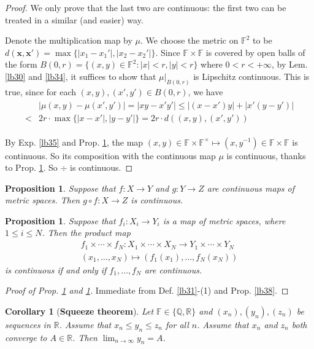 \documentclass[12pt,b5paper,notitlepage]{article}
\theoremstyle{definition}
\theoremstyle{plain}
\newtheorem{pp}[df]{Proposition}
\newtheorem{co}[df]{Corollary}
\newcommand{\mbf}{\mathbf}
\newcommand{\Qbb}{\mathbb Q}
\newcommand{\Rbb}{\mathbb R}
\newcommand{\Fbb}{\mathbb F}
\numberwithin{equation}{section}
\begin{document}
\begin{proof}
We only prove that the last two are continuous: the first two can be treated in a similar (and easier) way.

Denote the multiplication map by $\mu$. We choose the metric on $\Fbb^2$ to be $d(\mbf x,\mbf x')=\max\{|x_1-x_1'|,|x_2-x_2'|\}$. Since $\Fbb\times\Fbb$ is covered by open balls of the form $B(0,r)=\{(x,y)\in\Fbb^2:|x|<r,|y|<r\}$ where $0<r<+\infty$, by Lem. \ref{lb30} and \ref{lb34}, it suffices to show that $\mu|_{B(0,r)}$ is Lipschitz continuous. This is true, since for each $(x,y),(x',y')\in B(0,r)$, we have
\begin{align}\label{eq22}
\begin{aligned}
&|\mu(x,y)-\mu(x',y')|=|xy-x'y'|\leq |(x-x')y|+|x'(y-y')|\\
<&2r\cdot \max\{|x-x'|,|y-y'|\}=2r \cdot d((x,y),(x',y'))  
\end{aligned}
\end{align}

By Exp. \ref{lb35} and Prop. \ref{lb37}, the map $(x,y)\in\Fbb\times\Fbb^\times\mapsto (x,y^{-1})\in\Fbb\times\Fbb$ is continuous. So its composition with the continuous map $\mu$ is continuous, thanks to Prop. \ref{lb36}. So $\div$ is continuous. 
\end{proof}

\begin{pp}\label{lb36}
Suppose that $f:X\rightarrow Y$ and $g:Y\rightarrow Z$ are continuous maps of metric spaces. Then $g\circ f:X\rightarrow Z$ is continuous.
\end{pp}

\begin{pp}\label{lb37}
Suppose that $f_i:X_i\rightarrow Y_i$ is a map of metric spaces, where $1\leq i\leq N$. Then the product map 
\begin{gather*}
f_1\times\cdots\times f_N:X_1\times\cdots\times X_N\rightarrow Y_1\times\cdots\times Y_N\\
(x_1,\dots,x_N)\mapsto (f_1(x_1),\dots,f_N(x_N))
\end{gather*}
is continuous if and only if $f_1,\dots,f_N$ are continuous.
\end{pp}

\begin{proof}[Proof of Prop. \ref{lb36} and \ref{lb37}]
Immediate from Def. \ref{lb31}-(1) and Prop. \ref{lb38}.
\end{proof}


\begin{co}[\textbf{Squeeze theorem}]\label{lb61}
Let $\Fbb\in\{\Qbb,\Rbb\}$ and $(x_n),(y_n),(z_n)$ be sequences in $\Rbb$. Assume that $x_n\leq y_n\leq z_n$ for all $n$. Assume that $x_n$ and $z_n$ both converge to $A\in\Rbb$. Then $\lim_{n\rightarrow\infty}y_n=A$. 
\end{co}
\end{document}
